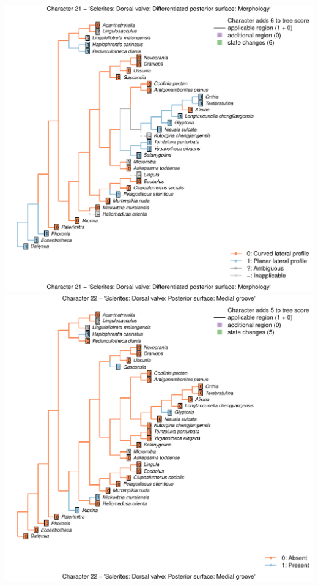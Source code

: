 \documentclass[]{book}
\theoremstyle{definition}
\theoremstyle{definition}
\theoremstyle{definition}
\theoremstyle{remark}
\begin{document}
\includegraphics{Brachiopod_phylogeny_files/figure-latex/unnamed-chunk-4-21.pdf}
\includegraphics{Brachiopod_phylogeny_files/figure-latex/unnamed-chunk-4-22.pdf}
\end{document}
